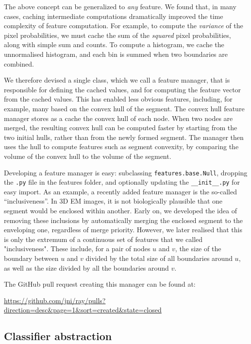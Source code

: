 \documentclass{frontiersSCNS} %
\begin{document}
The above concept can be generalized to \emph{any} feature.
We found that, in many cases, caching intermediate computations dramatically improved the time complexity of feature computation.
For example, to compute the \emph{variance} of the pixel probabilities, we must cache the sum of the \emph{squared} pixel probabilities, along with simple sum and counts.
To compute a histogram, we cache the unnormalised histogram, and each bin is summed when two boundaries are combined.

We therefore devised a single class, which we call a feature manager, that is responsible for defining the cached values, and for computing the feature vector from the cached values.
This has enabled less obvious features, including, for example, many based on the convex hull of the segment.
The convex hull feature manager stores as a cache the convex hull of each node.
When two nodes are merged, the resulting convex hull can be computed faster by starting from the two initial hulls, rather than from the newly formed segment.
The manager then uses the hull to compute features such as segment convexity, by comparing the volume of the convex hull to the volume of the segment.

Developing a feature manager is easy: subclassing \texttt{\small features.base.Null}, dropping the \texttt{.py} file in the features folder, and optionally updating the \texttt{\small \_\_init\_\_.py} for easy import.
As an example, a recently added feature manager is the so-called ``inclusiveness''.
In 3D EM images, it is not biologically plausible that one segment would be enclosed within another.
Early on, we developed the idea of removing these inclusions by automatically merging the enclosed segment to the enveloping one, regardless of merge priority.
However, we later realised that this is only the extremum of a continuous set of features that we called "inclusiveness".
These include, for a pair of nodes $u$ and $v$, the size of the boundary between $u$ and $v$ divided by the total size of all boundaries around $u$, as well as the size divided by all the boundaries around $v$.

The GitHub pull request creating this manager can be found at:

\url{https://github.com/jni/ray/pulls?direction=desc&page=1&sort=created&state=closed}

\subsection{Classifier abstraction}
\end{document}
